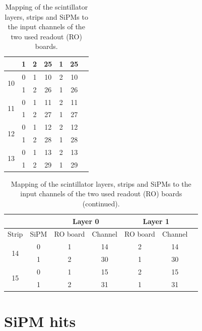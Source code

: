 \begin{table}[htb]
\begin{tabular}{|c|c|c|c|c|c|c}
        & 1 & 2 & 25 & 1 & 25 \\ \hline
        \multirow{2}{*}{10} & 0 & 1 & 10 & 2 & 10 \\
        & 1 & 2 & 26 & 1 & 26 \\ \hline
        \multirow{2}{*}{11} & 0 & 1 & 11 & 2 & 11 \\
        & 1 & 2 & 27 & 1 & 27 \\ \hline
        \multirow{2}{*}{12} & 0 & 1 & 12 & 2 & 12 \\
        & 1 & 2 & 28 & 1 & 28 \\ \hline
        \multirow{2}{*}{13} & 0 & 1 & 13 & 2 & 13 \\
        & 1 & 2 & 29 & 1 & 29 \\ \hline
    \end{tabular}
    \caption{Mapping of the scintillator layers, strips and \acp{SiPM} to the input channels of the two used readout (RO) boards.}
    \label{tab:Scint-ReadoutBoard-Channels}
\end{table}
\begin{table}[htb]
    \ContinuedFloat
    \centering
    \begin{tabular}{|c|c|c|c|c|c|c} 
        \hline
        \multicolumn{2}{|c|}{} & \multicolumn{2}{c|}{Layer 0} & \multicolumn{2}{c|}{Layer 1} \\ \hline
        Strip & \ac{SiPM} & RO board & Channel & RO board & Channel \\ \hline
        \multirow{2}{*}{14} & 0 & 1 & 14 & 2 & 14 \\
        & 1 & 2 & 30 & 1 & 30 \\ \hline
        \multirow{2}{*}{15} & 0 & 1 & 15 & 2 & 15 \\
        & 1 & 2 & 31 & 1 & 31 \\ \hline
    \end{tabular}
    \caption{Mapping of the scintillator layers, strips and \acp{SiPM} to the input channels of the two used readout (RO) boards (continued).}
\end{table}

\FloatBarrier
\section{SiPM hits}

\FloatBarrier
